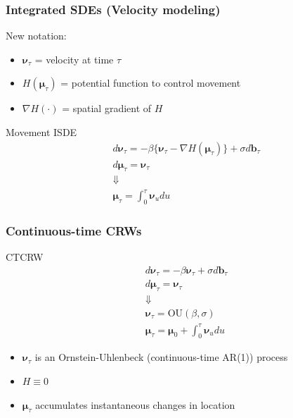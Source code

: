 \documentclass[36pt]{beamer}
\newcommand{\ft}[1]{\frametitle{#1}}
\newcommand{\bb}{\mathbf{b}}
\newcommand{\bmu}{\boldsymbol{\mu}}
\newcommand{\bv}{\boldsymbol{\nu}}
\begin{document}
\begin{frame}
\ft{Integrated SDEs (Velocity modeling)}
New notation:
\begin{itemize}
\item $\bv_\tau$ = velocity at time $\tau$
\item $H(\bmu_\tau)$ = potential function to control movement
\item $\nabla H(\cdot)$ = spatial gradient of $H$
\end{itemize}

\pause

\begin{block}{Movement ISDE}
$$
\begin{aligned}
&d\bv_\tau = -\beta\{\bv_\tau -\nabla H(\bmu_\tau) \} + \sigma d\bb_\tau \\
&d\bmu_\tau = \bv_\tau \\
&\Downarrow \\
&\bmu_\tau = \int_0^\tau \bv_u du
\end{aligned}
$$
\end{block}

\end{frame}


\begin{frame}
\ft{Continuous-time CRWs}
\begin{block}{CTCRW}
$$
\begin{aligned}
&d\bv_\tau = -\beta \bv_\tau + \sigma d\bb_\tau \\
&d\bmu_\tau = \bv_\tau \\
&\Downarrow \\
&\bv_\tau = \mbox{OU}(\beta, \sigma)\\
&\bmu_\tau = \bmu_0 + \int_0^\tau \bv_u du
\end{aligned}
$$
\end{block}

\begin{itemize}
\item $\bv_\tau$ is an Ornstein-Uhlenbeck (continuous-time AR(1)) process
\item $H\equiv 0$
\item $\bmu_\tau$ accumulates instantaneous changes in location
\end{itemize} 

\end{frame}

\end{document}
